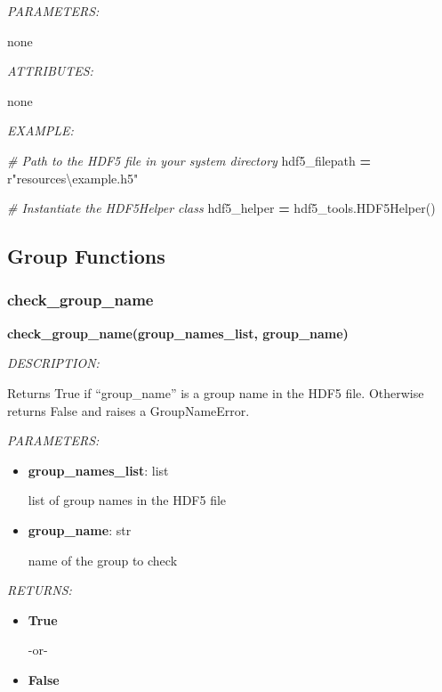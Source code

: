 \documentclass[
]{article}
\newenvironment{Shaded}{\begin{snugshade}}{\end{snugshade}}
\newcommand{\CommentTok}[1]{\textcolor[rgb]{0.56,0.35,0.01}{\textit{#1}}}
\newcommand{\NormalTok}[1]{#1}
\newcommand{\OperatorTok}[1]{\textcolor[rgb]{0.81,0.36,0.00}{\textbf{#1}}}
\newcommand{\VerbatimStringTok}[1]{\textcolor[rgb]{0.31,0.60,0.02}{#1}}
\begin{document}
\emph{PARAMETERS:}

none

\emph{ATTRIBUTES:}

none

\emph{EXAMPLE:}

\begin{Shaded}
\begin{Highlighting}[]
\CommentTok{# Path to the HDF5 file in your system directory}
\NormalTok{hdf5_filepath }\OperatorTok{=} \VerbatimStringTok{r"resources\textbackslash{}example.h5"}

\CommentTok{# Instantiate the HDF5Helper class}
\NormalTok{hdf5_helper }\OperatorTok{=}\NormalTok{ hdf5_tools.HDF5Helper()}
\end{Highlighting}
\end{Shaded}

\hypertarget{group-functions-2}{%
\subsection{Group Functions}\label{group-functions-2}}

\hypertarget{check_group_name}{%
\subsubsection{check\_group\_name}\label{check_group_name}}

\textbf{check\_group\_name(group\_names\_list, group\_name)}

\emph{DESCRIPTION:}

Returns True if ``group\_name'' is a group name in the HDF5 file. Otherwise returns False and raises a GroupNameError.

\emph{PARAMETERS:}

\begin{itemize}
\item
  \textbf{group\_names\_list}: list

  list of group names in the HDF5 file
\item
  \textbf{group\_name}: str

  name of the group to check
\end{itemize}

\emph{RETURNS:}

\begin{itemize}
\item
  \textbf{True}

  -or-
\item
  \textbf{False}
\end{itemize}
\end{document}
